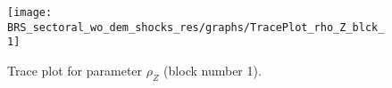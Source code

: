 \begin{figure}[H]
\centering
  \texttt{[image: BRS\_sectoral\_wo\_dem\_shocks\_res/graphs/TracePlot\_rho\_Z\_blck\_1]}\\
    \caption{Trace plot for parameter ${\rho_Z}$ (block number 1).}
\end{figure}
